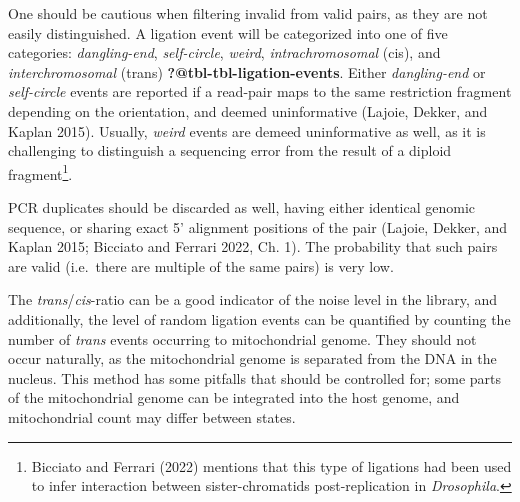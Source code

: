 \documentclass[
  11pt,
  a4paper,
]{scrbook}
\let\oldemph\emph
\renewcommand\emph[1]{\oldemph{\color{gray}#1}}
\begin{document}
One should be cautious when filtering invalid from valid pairs, as they
are not easily distinguished. A ligation event will be categorized into
one of five categories: \emph{dangling-end}, \emph{self-circle},
\emph{weird}, \emph{intrachromosomal} (cis), and \emph{interchromosomal}
(trans) \textbf{?@tbl-tbl-ligation-events}. Either \emph{dangling-end}
or \emph{self-circle} events are reported if a read-pair maps to the
same restriction fragment depending on the orientation, and deemed
uninformative (Lajoie, Dekker, and Kaplan 2015). Usually, \emph{weird}
events are demeed uninformative as well, as it is challenging to
distinguish a sequencing error from the result of a diploid
fragment\footnote{Bicciato and Ferrari (2022) mentions that this type of
  ligations had been used to infer interaction between sister-chromatids
  post-replication in \emph{Drosophila}.}.

PCR duplicates should be discarded as well, having either identical
genomic sequence, or sharing exact 5' alignment positions of the pair
(Lajoie, Dekker, and Kaplan 2015; Bicciato and Ferrari 2022, Ch. 1). The
probability that such pairs are valid (i.e.~there are multiple of the
same pairs) is very low.

The \emph{trans}/\emph{cis}-ratio can be a good indicator of the noise
level in the library, and additionally, the level of random ligation
events can be quantified by counting the number of \emph{trans} events
occurring to mitochondrial genome. They should not occur naturally, as
the mitochondrial genome is separated from the DNA in the nucleus. This
method has some pitfalls that should be controlled for; some parts of
the mitochondrial genome can be integrated into the host genome, and
mitochondrial count may differ between states.

\small
\end{document}
